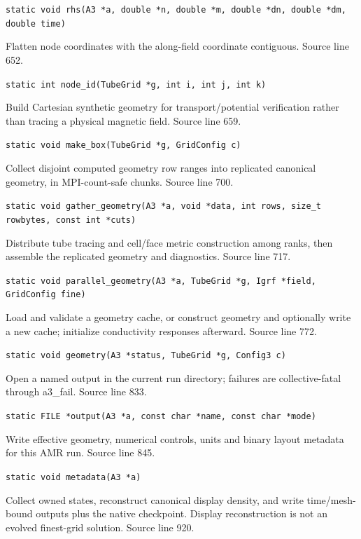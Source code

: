 \begin{description}[style=nextline,leftmargin=0pt,labelindent=0pt,labelwidth=0pt,labelsep=0pt]
{\small\nolinkurl{static void rhs(A3 *a, double *n, double *m, double *dn, double *dm, double time)}}
\item[\texttt{node\_id}] Flatten node coordinates with the along-field coordinate contiguous. Source line 652.\par
{\small\nolinkurl{static int node_id(TubeGrid *g, int i, int j, int k)}}
\item[\texttt{make\_box}] Build Cartesian synthetic geometry for transport/potential verification rather than tracing a physical magnetic field. Source line 659.\par
{\small\nolinkurl{static void make_box(TubeGrid *g, GridConfig c)}}
\item[\texttt{gather\_geometry}] Collect disjoint computed geometry row ranges into replicated canonical geometry, in MPI-count-safe chunks. Source line 700.\par
{\small\nolinkurl{static void gather_geometry(A3 *a, void *data, int rows, size_t rowbytes, const int *cuts)}}
\item[\texttt{parallel\_geometry}] Distribute tube tracing and cell/face metric construction among ranks, then assemble the replicated geometry and diagnostics. Source line 717.\par
{\small\nolinkurl{static void parallel_geometry(A3 *a, TubeGrid *g, Igrf *field, GridConfig fine)}}
\item[\texttt{geometry}] Load and validate a geometry cache, or construct geometry and optionally write a new cache; initialize conductivity responses afterward. Source line 772.\par
{\small\nolinkurl{static void geometry(A3 *status, TubeGrid *g, Config3 c)}}
\item[\texttt{output}] Open a named output in the current run directory; failures are collective-fatal through a3\_fail. Source line 833.\par
{\small\nolinkurl{static FILE *output(A3 *a, const char *name, const char *mode)}}
\item[\texttt{metadata}] Write effective geometry, numerical controls, units and binary layout metadata for this AMR run. Source line 845.\par
{\small\nolinkurl{static void metadata(A3 *a)}}
\item[\texttt{snapshot}] Collect owned states, reconstruct canonical display density, and write time/mesh-bound outputs plus the native checkpoint. Display reconstruction is not an evolved finest-grid solution. Source line 920.\par

\end{description}
